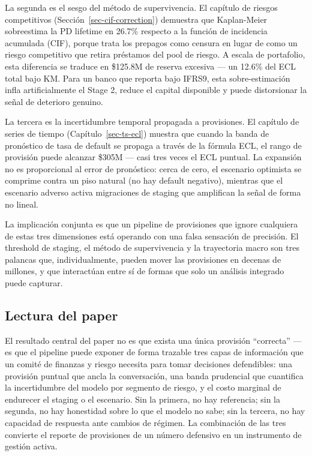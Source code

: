 \documentclass[
  spanish,
  11pt,
  letterpaper,
]{scrbook}
\theoremstyle{plain}
\theoremstyle{remark}
\begin{document}
La segunda es el sesgo del método de supervivencia. El capítulo de
riesgos competitivos (Sección~\ref{sec-cif-correction}) demuestra que
Kaplan-Meier sobreestima la PD lifetime en 26.7\% respecto a la función
de incidencia acumulada (CIF), porque trata los prepagos como censura en
lugar de como un riesgo competitivo que retira préstamos del pool de
riesgo. A escala de portafolio, esta diferencia se traduce en \$125.8M
de reserva excesiva --- un 12.6\% del ECL total bajo KM. Para un banco
que reporta bajo IFRS9, esta sobre-estimación infla artificialmente el
Stage 2, reduce el capital disponible y puede distorsionar la señal de
deterioro genuino.

La tercera es la incertidumbre temporal propagada a provisiones. El
capítulo de series de tiempo (Capítulo~\ref{sec-ts-ecl}) muestra que
cuando la banda de pronóstico de tasa de default se propaga a través de
la fórmula ECL, el rango de provisión puede alcanzar \$305M --- casi
tres veces el ECL puntual. La expansión no es proporcional al error de
pronóstico: cerca de cero, el escenario optimista se comprime contra un
piso natural (no hay default negativo), mientras que el escenario
adverso activa migraciones de staging que amplifican la señal de forma
no lineal.

La implicación conjunta es que un pipeline de provisiones que ignore
cualquiera de estas tres dimensiones está operando con una falsa
sensación de precisión. El threshold de staging, el método de
supervivencia y la trayectoria macro son tres palancas que,
individualmente, pueden mover las provisiones en decenas de millones, y
que interactúan entre sí de formas que solo un análisis integrado puede
capturar.

\subsection{Lectura del paper}\label{lectura-del-paper}

El resultado central del paper no es que exista una única provisión
``correcta'' --- es que el pipeline puede exponer de forma trazable tres
capas de información que un comité de finanzas y riesgo necesita para
tomar decisiones defendibles: una provisión puntual que ancla la
conversación, una banda prudencial que cuantifica la incertidumbre del
modelo por segmento de riesgo, y el costo marginal de endurecer el
staging o el escenario. Sin la primera, no hay referencia; sin la
segunda, no hay honestidad sobre lo que el modelo no sabe; sin la
tercera, no hay capacidad de respuesta ante cambios de régimen. La
combinación de las tres convierte el reporte de provisiones de un número
defensivo en un instrumento de gestión activa.
\end{document}
